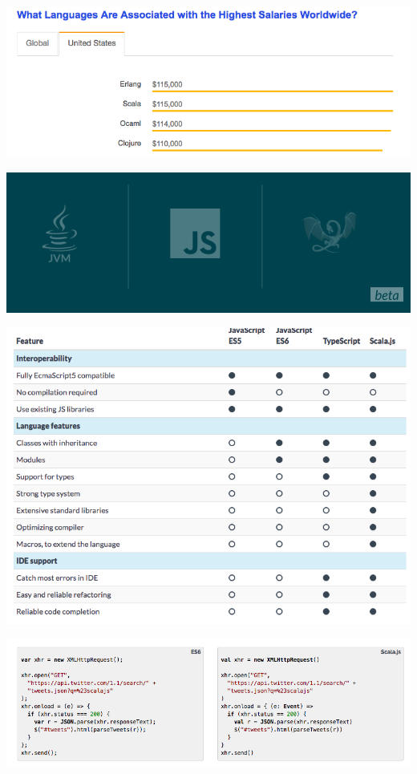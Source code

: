 \documentclass{beamer}
\begin{document}
\begin{frame}
    \includegraphics[width=\textwidth]{SO2018US.png}
\end{frame}

\begin{frame}
    \includegraphics[width=\textwidth]{Platforms.png}
\end{frame}

\begin{frame}
    \includegraphics[width=\textwidth]{ScalaJS.png}
\end{frame}

\begin{frame}
    \includegraphics[width=\textwidth]{Interop.png}
\end{frame}
\end{document}
